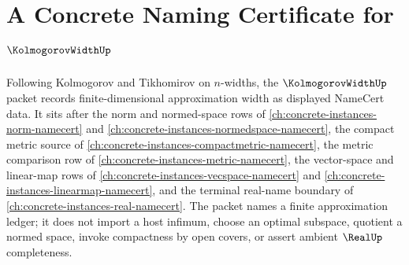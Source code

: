 \chapter{A Concrete Naming Certificate for $\KolmogorovWidthUp$}
\label{ch:concrete-instances-kolmogorov-width-namecert}

Following Kolmogorov and Tikhomirov on $n$-widths, the $\KolmogorovWidthUp$ packet records finite-dimensional approximation width as displayed NameCert data. It sits after the norm and normed-space rows of \autoref{ch:concrete-instances-norm-namecert} and \autoref{ch:concrete-instances-normedspace-namecert}, the compact metric source of \autoref{ch:concrete-instances-compactmetric-namecert}, the metric comparison row of \autoref{ch:concrete-instances-metric-namecert}, the vector-space and linear-map rows of \autoref{ch:concrete-instances-vecspace-namecert} and \autoref{ch:concrete-instances-linearmap-namecert}, and the terminal real-name boundary of \autoref{ch:concrete-instances-real-namecert}. The packet names a finite approximation ledger; it does not import a host infimum, choose an optimal subspace, quotient a normed space, invoke compactness by open covers, or assert ambient $\RealUp$ completeness.

